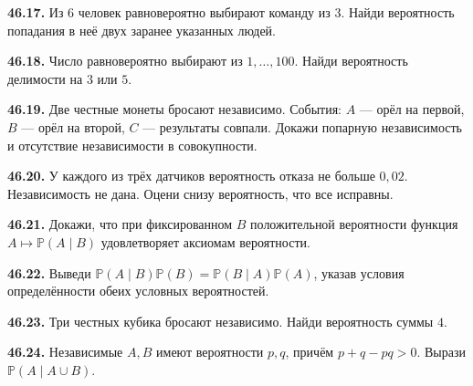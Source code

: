 \noindent\begin{minipage}[t]{\linewidth}\textbf{46.17.} Из \(6\) человек равновероятно выбирают команду из \(3\). Найди вероятность попадания в неё двух заранее указанных людей.\par\end{minipage}\par
\noindent\begin{minipage}[t]{\linewidth}\textbf{46.18.} Число равновероятно выбирают из \(1,\ldots,100\). Найди вероятность делимости на \(3\) или \(5\).\par\end{minipage}\par
\noindent\begin{minipage}[t]{\linewidth}\textbf{46.19.}\starmark{} Две честные монеты бросают независимо. События: \(A\) — орёл на первой, \(B\) — орёл на второй, \(C\) — результаты совпали. Докажи попарную независимость и отсутствие независимости в совокупности.\par\end{minipage}\par
\noindent\begin{minipage}[t]{\linewidth}\textbf{46.20.} У каждого из трёх датчиков вероятность отказа не больше \(0{,}02\). Независимость не дана. Оцени снизу вероятность, что все исправны.\par\end{minipage}\par
\noindent\begin{minipage}[t]{\linewidth}\textbf{46.21.}\starmark{} Докажи, что при фиксированном \(B\) положительной вероятности функция \(A\mapsto\mathbb P(A\mid B)\) удовлетворяет аксиомам вероятности.\par\end{minipage}\par
\noindent\begin{minipage}[t]{\linewidth}\textbf{46.22.} Выведи \(\mathbb P(A\mid B)\mathbb P(B)=\mathbb P(B\mid A)\mathbb P(A)\), указав условия определённости обеих условных вероятностей.\par\end{minipage}\par
\noindent\begin{minipage}[t]{\linewidth}\textbf{46.23.}\starmark{} Три честных кубика бросают независимо. Найди вероятность суммы \(4\).\par\end{minipage}\par
\noindent\begin{minipage}[t]{\linewidth}\textbf{46.24.}\starmark{} Независимые \(A,B\) имеют вероятности \(p,q\), причём \(p+q-pq>0\). Вырази \(\mathbb P(A\mid A\cup B)\).\par\end{minipage}\par
